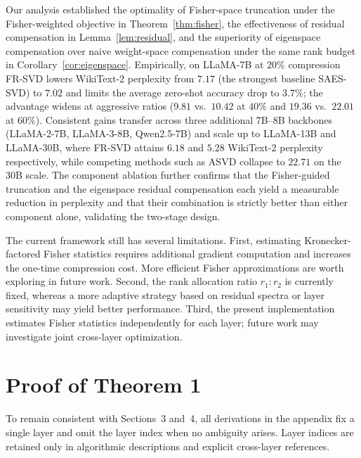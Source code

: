 \documentclass[a4paper,fleqn]{cas-dc}
\begin{document}
Our analysis established the optimality of Fisher-space truncation under the Fisher-weighted objective in Theorem~\ref{thm:fisher}, the effectiveness of residual compensation in Lemma~\ref{lem:residual}, and the superiority of eigenspace compensation over naive weight-space compensation under the same rank budget in Corollary~\ref{cor:eigenspace}. Empirically, on LLaMA-7B at $20\%$ compression FR-SVD lowers WikiText-2 perplexity from $7.17$ (the strongest baseline SAES-SVD) to $7.02$ and limits the average zero-shot accuracy drop to $3.7\%$; the advantage widens at aggressive ratios ($9.81$ vs.\ $10.42$ at $40\%$ and $19.36$ vs.\ $22.01$ at $60\%$). Consistent gains transfer across three additional 7B--8B backbones (LLaMA-2-7B, LLaMA-3-8B, Qwen2.5-7B) and scale up to LLaMA-13B and LLaMA-30B, where FR-SVD attains $6.18$ and $5.28$ WikiText-2 perplexity respectively, while competing methods such as ASVD collapse to $22.71$ on the 30B scale. The component ablation further confirms that the Fisher-guided truncation and the eigenspace residual compensation each yield a measurable reduction in perplexity and that their combination is strictly better than either component alone, validating the two-stage design.

The current framework still has several limitations. First, estimating Kronecker-factored Fisher statistics requires additional gradient computation and increases the one-time compression cost. More efficient Fisher approximations are worth exploring in future work. Second, the rank allocation ratio $r_1:r_2$ is currently fixed, whereas a more adaptive strategy based on residual spectra or layer sensitivity may yield better performance. Third, the present implementation estimates Fisher statistics independently for each layer; future work may investigate joint cross-layer optimization.

\FloatBarrier   %
\appendix
\setcounter{secnumdepth}{3}

\section{Proof of Theorem 1}\label{app:thm1}

To remain consistent with Sections~3 and~4, all derivations in the appendix fix a single layer and omit the layer index when no ambiguity arises. Layer indices are retained only in algorithmic descriptions and explicit cross-layer references.
\end{document}
